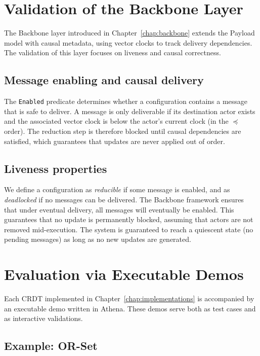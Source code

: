 \section{Validation of the Backbone Layer}

The Backbone layer introduced in Chapter~\ref{chap:backbone} extends the Payload model with causal metadata, using vector clocks to track delivery dependencies. The validation of this layer focuses on liveness and causal correctness.

\subsection{Message enabling and causal delivery}

The \texttt{Enabled} predicate determines whether a configuration contains a message that is safe to deliver. A message is only deliverable if its destination actor exists and the associated vector clock is below the actor's current clock (in the $\preceq$ order). The reduction step is therefore blocked until causal dependencies are satisfied, which guarantees that updates are never applied out of order.

\subsection{Liveness properties}

We define a configuration as \emph{reducible} if some message is enabled, and as \emph{deadlocked} if no messages can be delivered. The Backbone framework ensures that under eventual delivery, all messages will eventually be enabled. This guarantees that no update is permanently blocked, assuming that actors are not removed mid-execution. The system is guaranteed to reach a quiescent state (no pending messages) as long as no new updates are generated.

\section{Evaluation via Executable Demos}

Each CRDT implemented in Chapter~\ref{chap:implementations} is accompanied by an executable demo written in Athena. These demos serve both as test cases and as interactive validations.

\subsection{Example: OR-Set}

